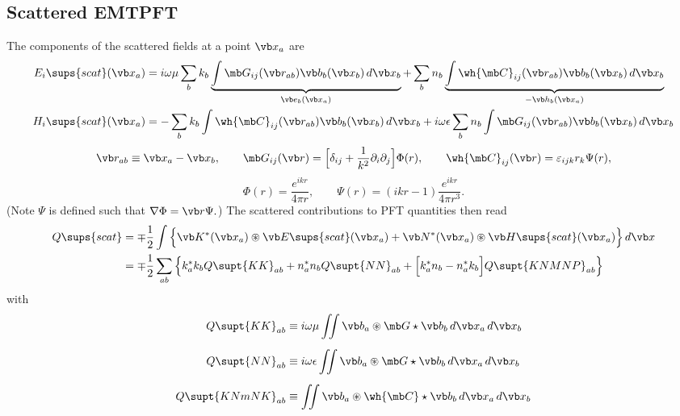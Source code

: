 \subsection{Scattered EMTPFT}

The components of the scattered fields at a point $\vb x_a$ are
\begin{align*}
 E_i\sups{scat}(\vb x_a)
 &= i\omega \mu \sum_b k_b 
    \underbrace{\int \mb G_{ij}(\vb r_{ab})\vb b_b(\vb x_b)\,d\vb x_b}_{\vb e_b(\vb x_a)}
   +\sum_b n_b 
    \underbrace{\int \wh{\mb C}_{ij}(\vb r_{ab})\vb b_b(\vb x_b)\,d\vb x_b}_{-\vb h_b(\vb x_a)}
\\
 H_i\sups{scat}(\vb x_a)
 &= -\sum_b k_b \int \wh{\mb C}_{ij}(\vb r_{ab})\vb b_b(\vb x_b)\,d\vb x_b
    +i\omega \epsilon \sum_b n_b \int \mb G_{ij}(\vb r_{ab})\vb b_b(\vb x_b)\,d\vb x_b
\end{align*}
$$\vb r_{ab} \equiv \vb x_a - \vb x_b, 
  \qquad
  \mb G_{ij}(\vb r) 
   = \Big[ \delta_{ij} + \frac{1}{k^2}\partial_i\partial_j\Big]\Phi(r),
  \qquad
  \wh{\mb C}_{ij}(\vb r) = \varepsilon_{ijk} r_k \Psi(r), 
$$
$$ \Phi(r) = \frac{e^{ikr}}{4\pi r}, 
   \qquad 
   \Psi(r) = (ikr-1)\frac{e^{ikr}}{4\pi r^3}.
$$
(Note $\Psi$ is defined such that $\nabla \Phi=\vb r\Psi.$)
The scattered contributions to PFT quantities then read
\begin{align*}
Q\sups{scat}
&= \mp\frac{1}{2}
   \int\Big\{
    \vb K^*(\vb x_a) \circledast \vb E\sups{scat}(\vb x_a)
  + \vb N^*(\vb x_a) \circledast \vb H\sups{scat}(\vb x_a)
      \Big\} \, d\vb x
\\
&=\mp \frac{1}{2}
  \sum_{ab} \Big\{  k_a^* k_b Q\supt{KK}_{ab}
                   + n_a^* n_b Q\supt{NN}_{ab}
                   +\Big[k_a^* n_b - n_a^* k_b\Big] Q\supt{KNMNP}_{ab}
            \Big\}
\end{align*}
with
\begin{align*}
Q\supt{KK}_{ab} 
 &\equiv i\omega \mu \iint \vb b_a \circledast \mb G \star \vb b_b \, d\vb x_a \, d\vb x_b
\\[5pt]
Q\supt{NN}_{ab} 
 &\equiv i\omega \epsilon \iint \vb b_a \circledast \mb G \star \vb b_b \, d\vb x_a \, d\vb x_b
\\[5pt]
Q\supt{KNmNK}_{ab} 
 &\equiv \iint \vb b_a \circledast \wh{\mb C} \star \vb b_b \, d\vb x_a \, d\vb x_b
\\[5pt]
\end{align*}

